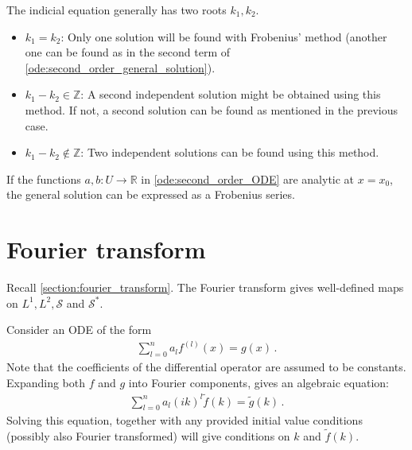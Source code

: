     \begin{property}
        The indicial equation generally has two roots $k_1,k_2$.
        \begin{itemize}
            \item $k_1=k_2$: Only one solution will be found with Frobenius' method (another one can be found as in the second term of \cref{ode:second_order_general_solution}).
            \item $k_1-k_2 \in\mathbb{Z}$: A second independent solution might be obtained using this method. If not, a second solution can be found as mentioned in the previous case.
            \item $k_1-k_2\not\in\mathbb{Z}$: Two independent solutions can be found using this method.
        \end{itemize}
    \end{property}

    \begin{theorem}[Fuchs]
        If the functions $a,b:U\rightarrow\mathbb{R}$ in \cref{ode:second_order_ODE} are analytic at $x=x_0$, the general solution can be expressed as a Frobenius series.
    \end{theorem}

\section{Fourier transform}

    Recall \cref{section:fourier_transform}. The Fourier transform gives well-defined maps on $L^1, L^2,\mathcal{S}$ and $\mathcal{S}^*$.
    
    Consider an ODE of the form
    \begin{gather}
        \sum_{l=0}^na_lf^{(l)}(x) = g(x)\,.
    \end{gather}
    Note that the coefficients of the differential operator are assumed to be constants. Expanding both $f$ and $g$ into Fourier components, gives an algebraic equation:
    \begin{gather}
        \sum_{l=0}^na_l(ik)^l\widetilde{f}(k) = \widetilde{g}(k)\,.
    \end{gather}
    Solving this equation, together with any provided initial value conditions (possibly also Fourier transformed) will give conditions on $k$ and $\widetilde{f}(k)$.

